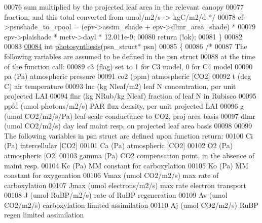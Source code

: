 \begin{DoxyCode}
00076 \textcolor{comment}{        sum multiplied by the projected leaf area in the relevant canopy}
00077 \textcolor{comment}{        fraction, and this total converted from umol/m2/s -> kgC/m2/d */}
00078     cf->psnshade\_to\_cpool = (epv->assim\_shade + epv->dlmr\_area\_shade) *
00079         epv->plaishade * metv->dayl * 12.011e-9;
00080     return (!ok);
00081 \}
00082 
00083 
\hypertarget{photosynthesis_8c_source_l00084}{}\hyperlink{photosynthesis_8c_a7694972f8a6aaea60ca6d5506d705060}{00084} \textcolor{keywordtype}{int} \hyperlink{photosynthesis_8c_a7694972f8a6aaea60ca6d5506d705060}{photosynthesis}(psn\_struct* psn)
00085 \{
00086     \textcolor{comment}{/*}
00087 \textcolor{comment}{    The following variables are assumed to be defined in the psn struct}
00088 \textcolor{comment}{    at the time of the function call:}
00089 \textcolor{comment}{    c3         (flag) set to 1 for C3 model, 0 for C4 model}
00090 \textcolor{comment}{    pa         (Pa) atmospheric pressure }
00091 \textcolor{comment}{    co2        (ppm) atmospheric [CO2] }
00092 \textcolor{comment}{    t          (deg C) air temperature}
00093 \textcolor{comment}{    lnc        (kg Nleaf/m2) leaf N concentration, per unit projected LAI }
00094 \textcolor{comment}{    flnr       (kg NRub/kg Nleaf) fraction of leaf N in Rubisco}
00095 \textcolor{comment}{    ppfd       (umol photons/m2/s) PAR flux density, per unit projected LAI}
00096 \textcolor{comment}{    g          (umol CO2/m2/s/Pa) leaf-scale conductance to CO2, proj area basis}
00097 \textcolor{comment}{    dlmr       (umol CO2/m2/s) day leaf maint resp, on projected leaf area basis}
00098 \textcolor{comment}{    }
00099 \textcolor{comment}{    The following variables in psn struct are defined upon function return:}
00100 \textcolor{comment}{    Ci         (Pa) intercellular [CO2]}
00101 \textcolor{comment}{    Ca         (Pa) atmospheric [CO2]}
00102 \textcolor{comment}{    O2         (Pa) atmospheric [O2]}
00103 \textcolor{comment}{    gamma      (Pa) CO2 compensation point, in the absence of maint resp.}
00104 \textcolor{comment}{    Kc         (Pa) MM constant for carboxylation}
00105 \textcolor{comment}{    Ko         (Pa) MM constant for oxygenation}
00106 \textcolor{comment}{    Vmax       (umol CO2/m2/s) max rate of carboxylation}
00107 \textcolor{comment}{    Jmax       (umol electrons/m2/s) max rate electron transport}
00108 \textcolor{comment}{    J          (umol RuBP/m2/s) rate of RuBP regeneration}
00109 \textcolor{comment}{    Av         (umol CO2/m2/s) carboxylation limited assimilation}
00110 \textcolor{comment}{    Aj         (umol CO2/m2/s) RuBP regen limited assimilation}

\end{DoxyCode}
